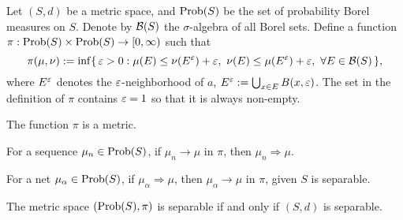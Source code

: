 \documentclass[a4paper]{article}
\begin{document}
\begin{thm}
Let $(S,d)$ be a metric space, and $\operatorname{Prob}(S)$ be the set of probability Borel measures on $S$.
Denote by $\mathcal{B}(S)$ the $\sigma$-algebra of all Borel sets.
Define a function $\pi:\operatorname{Prob}(S)\times\operatorname{Prob}(S)\to[0,\infty)$ such that
\[\pi(\mu,\nu):=\inf\{\,\e>0:\mu(E)\le\nu(E^\e)+\e,\ \nu(E)\le\mu(E^\e)+\e,\ \forall E\in\cB(S)\,\},\]
where $E^\varepsilon$ denotes the $\varepsilon$-neighborhood of $a$, $E^\varepsilon:=\bigcup_{x\in E}B(x,\varepsilon)$.
The set in the definition of $\pi$ contains $\varepsilon=1$ so that it is always non-empty.
\begin{parts}
\item The function $\pi$ is a metric.
\item For a sequence $\mu_n\in\operatorname{Prob}(S)$, if $\mu_n\to\mu$ in $\pi$, then $\mu_n\Rightarrow\mu$.
\item For a net $\mu_\alpha\in\operatorname{Prob}(S)$, if $\mu_\alpha\Rightarrow\mu$, then $\mu_\alpha\to\mu$ in $\pi$, given $S$ is separable.
\item The metric space $(\operatorname{Prob}(S),\pi)$ is separable if and only if $(S,d)$ is separable.
\end{parts}
\end{thm}
\end{document}
